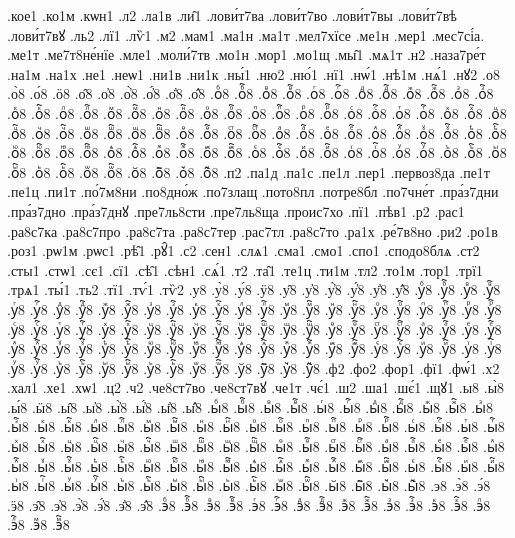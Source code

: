 {.кое1
.ко1м
.кѡн1
.л2
.ла1в
.ли̑1
.лови́т7ва
.лови́т7во
.лови́т7вы
.лови́т7вѣ
.лови́т7вꙋ
.ль2
.лї1
.лѷ1
.м2
.мам1
.ма1н
.ма1т
.мел7хїсе
.ме1н
.мер1
.мес7сі́а.
.ме1т
.ме7т8не́нїе
.мле1
.моли́7тв
.мо1н
.мор1
.мо1щ
.мы̑1
.мѧ1т
.н2
.наза7ре́т
.на1м
.на1х
.не1
.неѡ1
.ни1в
.ни1к
.ны́1
.ню2
.ню́1
.нї1
.нѡ́1
.нѣ1м
.нѧ́1
.нꙋ2
.о8
.о̀8
.о́8
.ӧ8
.о̑8
.о҆8
.о҆̀8
.о҆́8
.о҆̈8
.о҆̑8
.оⷠ8
.оⷠ҇8
.оⷡ8
.оⷡ҇8
.оⷢ8
.оⷢ҇8
.оⷣ8
.оⷣ҇8
.оⷤ8
.оⷤ҇8
.оⷥ8
.оⷥ҇8
.оⷦ8
.оⷦ҇8
.оⷧ8
.оⷧ҇8
.оⷨ8
.оⷨ҇8
.оⷩ8
.оⷩ҇8
.оⷪ8
.оⷪ҇8
.оⷫ8
.оⷫ҇8
.оⷬ8
.оⷬ҇8
.оⷭ8
.оⷭ҇8
.оⷮ8
.оⷮ҇8
.оⷯ8
.оⷯ҇8
.оⷰ8
.оⷰ҇8
.оⷱ8
.оⷱ҇8
.оⷲ8
.оⷲ҇8
.оⷳ8
.оⷳ҇8
.оⷴ8
.оⷴ҇8
.оⷵ8
.оⷵ҇8
.оⷶ8
.оⷶ҇8
.оⷷ8
.оⷷ҇8
.оⷸ8
.оⷸ҇8
.оⷹ8
.оⷹ҇8
.оⷺ8
.оⷺ҇8
.оⷻ8
.оⷻ҇8
.оⷼ8
.оⷼ҇8
.оⷽ8
.оⷽ҇8
.оⷾ8
.оⷾ҇8
.оⷿ8
.оⷿ҇8
.оꙴ8
.оꙴ҇8
.оꙵ8
.оꙵ҇8
.оꙶ8
.оꙶ҇8
.оꙷ8
.оꙷ҇8
.оꙸ8
.оꙸ҇8
.оꙹ8
.оꙹ҇8
.оꙺ8
.оꙺ҇8
.оꙻ8
.оꙻ҇8
.о꙼8
.о꙼҇8
.о꙽8
.о꙽҇8
.п2
.па1д
.па1с
.пе1л
.пер1
.первоз8да
.пе1т
.пе1ц
.пи1т
.по́7м8ни
.по8дно́ж
.по7злащ
.пото8пл
.потре8бл
.по7чне́т
.пра́з7дни
.пра́з7дно
.пра́з7днꙋ
.пре7ль8сти
.пре7ль8ща
.проис7хо
.пї1
.пѣв1
.р2
.рас1
.ра8с7ка
.ра8с7про
.ра8с7та
.ра8с7тер
.рас7тл
.ра8с7то
.ра1х
.ре́7в8но
.ри2
.ро1в
.роз1
.рѡ1м
.рѡс1
.рѣ̑1
.рꙋ̑1
.с2
.сен1
.слѧ1
.сма1
.смо1
.спо1
.сподо8блѧ
.ст2
.сты1
.стѡ1
.сє1
.сї1
.сѣ̑1
.сѣн1
.сѧ́1
.т2
.та̑1
.те1ц
.ти1м
.тл2
.то1м
.тор1
.трї1
.трѧ1
.ты́1
.ть2
.тї1
.тѵ́1
.тѷ2
.у8
.у̀8
.у́8
.ӱ8
.у̑8
.у҆8
.у҆̀8
.у҆́8
.у҆̈8
.у҆̑8
.уⷠ8
.уⷠ҇8
.уⷡ8
.уⷡ҇8
.уⷢ8
.уⷢ҇8
.уⷣ8
.уⷣ҇8
.уⷤ8
.уⷤ҇8
.уⷥ8
.уⷥ҇8
.уⷦ8
.уⷦ҇8
.уⷧ8
.уⷧ҇8
.уⷨ8
.уⷨ҇8
.уⷩ8
.уⷩ҇8
.уⷪ8
.уⷪ҇8
.уⷫ8
.уⷫ҇8
.уⷬ8
.уⷬ҇8
.уⷭ8
.уⷭ҇8
.уⷮ8
.уⷮ҇8
.уⷯ8
.уⷯ҇8
.уⷰ8
.уⷰ҇8
.уⷱ8
.уⷱ҇8
.уⷲ8
.уⷲ҇8
.уⷳ8
.уⷳ҇8
.уⷴ8
.уⷴ҇8
.уⷵ8
.уⷵ҇8
.уⷶ8
.уⷶ҇8
.уⷷ8
.уⷷ҇8
.уⷸ8
.уⷸ҇8
.уⷹ8
.уⷹ҇8
.уⷺ8
.уⷺ҇8
.уⷻ8
.уⷻ҇8
.уⷼ8
.уⷼ҇8
.уⷽ8
.уⷽ҇8
.уⷾ8
.уⷾ҇8
.уⷿ8
.уⷿ҇8
.уꙴ8
.уꙴ҇8
.уꙵ8
.уꙵ҇8
.уꙶ8
.уꙶ҇8
.уꙷ8
.уꙷ҇8
.уꙸ8
.уꙸ҇8
.уꙹ8
.уꙹ҇8
.уꙺ8
.уꙺ҇8
.уꙻ8
.уꙻ҇8
.у꙼8
.у꙼҇8
.у꙽8
.у꙽҇8
.ф2
.фо2
.фор1
.фї1
.фѡ́1
.х2
.хал1
.хе1
.хѡ1
.ц2
.ч2
.че8ст7во
.че8ст7вꙋ
.че1т
.чє́1
.ш2
.ша1
.шє́1
.щꙋ1
.ы8
.ы̀8
.ы́8
.ӹ8
.ы̑8
.ы҆8
.ы҆̀8
.ы҆́8
.ы҆̈8
.ы҆̑8
.ыⷠ8
.ыⷠ҇8
.ыⷡ8
.ыⷡ҇8
.ыⷢ8
.ыⷢ҇8
.ыⷣ8
.ыⷣ҇8
.ыⷤ8
.ыⷤ҇8
.ыⷥ8
.ыⷥ҇8
.ыⷦ8
.ыⷦ҇8
.ыⷧ8
.ыⷧ҇8
.ыⷨ8
.ыⷨ҇8
.ыⷩ8
.ыⷩ҇8
.ыⷪ8
.ыⷪ҇8
.ыⷫ8
.ыⷫ҇8
.ыⷬ8
.ыⷬ҇8
.ыⷭ8
.ыⷭ҇8
.ыⷮ8
.ыⷮ҇8
.ыⷯ8
.ыⷯ҇8
.ыⷰ8
.ыⷰ҇8
.ыⷱ8
.ыⷱ҇8
.ыⷲ8
.ыⷲ҇8
.ыⷳ8
.ыⷳ҇8
.ыⷴ8
.ыⷴ҇8
.ыⷵ8
.ыⷵ҇8
.ыⷶ8
.ыⷶ҇8
.ыⷷ8
.ыⷷ҇8
.ыⷸ8
.ыⷸ҇8
.ыⷹ8
.ыⷹ҇8
.ыⷺ8
.ыⷺ҇8
.ыⷻ8
.ыⷻ҇8
.ыⷼ8
.ыⷼ҇8
.ыⷽ8
.ыⷽ҇8
.ыⷾ8
.ыⷾ҇8
.ыⷿ8
.ыⷿ҇8
.ыꙴ8
.ыꙴ҇8
.ыꙵ8
.ыꙵ҇8
.ыꙶ8
.ыꙶ҇8
.ыꙷ8
.ыꙷ҇8
.ыꙸ8
.ыꙸ҇8
.ыꙹ8
.ыꙹ҇8
.ыꙺ8
.ыꙺ҇8
.ыꙻ8
.ыꙻ҇8
.ы꙼8
.ы꙼҇8
.ы꙽8
.ы꙽҇8
.э8
.э̀8
.э́8
.ӭ8
.э̑8
.э҆8
.э҆̀8
.э҆́8
.э҆̈8
.э҆̑8
.эⷠ8
.эⷠ҇8
.эⷡ8
.эⷡ҇8
.эⷢ8
.эⷢ҇8
.эⷣ8
.эⷣ҇8
.эⷤ8
.эⷤ҇8
.эⷥ8
.эⷥ҇8
.эⷦ8
.эⷦ҇8
.эⷧ8
.эⷧ҇8
.эⷨ8
.эⷨ҇8
}
